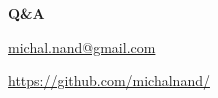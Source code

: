 \documentclass[xcolor=dvipsnames]{beamer}
\begin{document}
\begin{frame}{\bf Q\&A}


\url{michal.nand@gmail.com}

\url{https://github.com/michalnand/}

 
\end{frame}
\end{document}
